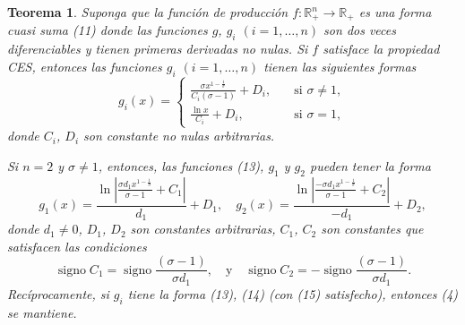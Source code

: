 \documentclass[a4paper,fleqn]{cas-dc}
\newtheorem{theorem}{Teorema}
\begin{document}
\begin{theorem}
Suponga que la función de producción $f\colon\mathds{R}^{n}_{+}\rightarrow\mathds{R}_{+}$ es una forma cuasi suma (11) donde las funciones $g$, $g_{i}$ $(i=1,\ldots,n)$ son dos veces diferenciables y tienen primeras derivadas no nulas. Si $f$ satisface la propiedad CES, entonces las funciones $g_{i}$ $(i=1,\ldots,n)$ tienen las siguientes formas
\begin{equation}
g_{i}\left(x\right)=
\begin{cases}
\frac{\sigma x^{1-\frac{1}{\sigma}}}{C_{i}\left(\sigma-1\right)}+D_{i},\quad&\text{si }\sigma\neq1,\\
\frac{\ln x}{C_{i}}+D_{i},\quad&\text{si }\sigma=1,
\end{cases}
\end{equation}
donde $C_{i}$, $D_{i}$ son constante no nulas arbitrarias.

Si $n=2$ y $\sigma\neq1$, entonces, las funciones (13), $g_{1}$ y $g_{2}$ pueden tener la forma
\begin{equation}
g_{1}\left(x\right)=\frac{\ln\left|\frac{\sigma d_{1}x^{1-\frac{1}{\sigma}}}{\sigma-1}+C_{1}\right|}{d_{1}}+D_{1},\quad g_{2}\left(x\right)=\frac{\ln\left|\frac{-\sigma d_{1}x^{1-\frac{1}{\sigma}}}{\sigma-1}+C_{2}\right|}{-d_{1}}+D_{2},
\end{equation}
donde $d_{1}\neq0$, $D_{1}$, $D_{2}$ son constantes arbitrarias, $C_{1}$, $C_{2}$ son constantes que satisfacen las condiciones
\begin{equation}
\operatorname{signo}C_{1}=\operatorname{signo}\frac{\left(\sigma-1\right)}{\sigma d_{1}},\quad\text{y}\quad\operatorname{signo}C_{2}=-\operatorname{signo}\frac{\left(\sigma-1\right)}{\sigma d_{1}}.
\end{equation}
Recíprocamente, si $g_{i}$ tiene la forma (13), (14) (con (15) satisfecho), entonces (4) se mantiene.
\end{theorem}
\end{document}
